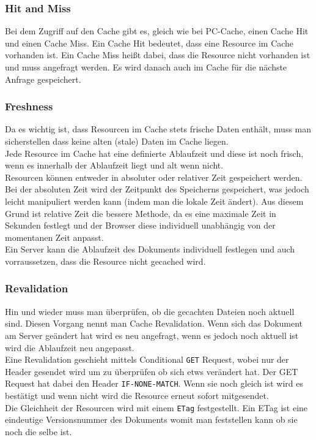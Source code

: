 \documentclass{article}
\begin{document}
\begin{itemize}
	\subsubsection{Hit and Miss}
	Bei dem Zugriff auf den Cache gibt es, gleich wie bei PC-Cache, einen Cache Hit und einen Cache Miss. Ein Cache Hit bedeutet, dass eine Resource im Cache vorhanden ist. Ein Cache Miss heißt dabei, dass die Resource nicht vorhanden ist und muss angefragt werden. Es wird danach auch im Cache für die nächste Anfrage gespeichert.
	\subsubsection{Freshness}
	Da es wichtig ist, dass Resourcen im Cache stets frische Daten enthält, muss man sicherstellen dass keine alten (stale) Daten im Cache liegen. \\
	Jede Resource im Cache hat eine definierte Ablaufzeit und diese ist noch frisch, wenn es innerhalb der Ablaufzeit liegt und alt wenn nicht. \\
	Resourcen können entweder in absoluter oder relativer Zeit gespeichert werden. Bei der absoluten Zeit wird der Zeitpunkt des Speicherns gespeichert, was jedoch leicht manipuliert werden kann (indem man die lokale Zeit ändert). Aus diesem Grund ist relative Zeit die bessere Methode, da es eine maximale Zeit in Sekunden festlegt und der Browser diese individuell unabhängig von der momentanen Zeit anpasst. \\
	Ein Server kann die Ablaufzeit des Dokuments individuell festlegen und auch vorraussetzen, dass die Resource nicht gecached wird.
	\subsubsection{Revalidation}
	Hin und wieder muss man überprüfen, ob die gecachten Dateien noch aktuell sind. Diesen Vorgang nennt man Cache Revalidation. Wenn sich das Dokument am Server geändert hat wird es neu angefragt, wenn es jedoch noch aktuell ist wird die Ablaufzeit neu angepasst. \\
	Eine Revalidation geschieht mittels Conditional \texttt{GET} Request, wobei nur der Header gesendet wird um zu überprüfen ob sich etws verändert hat. Der GET Request hat dabei den Header \texttt{IF-NONE-MATCH}. Wenn sie noch gleich ist wird es bestätigt und wenn nicht wird die Resource erneut sofort mitgesendet. \\
	Die Gleichheit der Resourcen wird mit einem \texttt{ETag} festgestellt. Ein ETag ist eine eindeutige Versionsnummer des Dokuments womit man feststellen kann ob sie noch die selbe ist.

\end{itemize}
\end{document}
